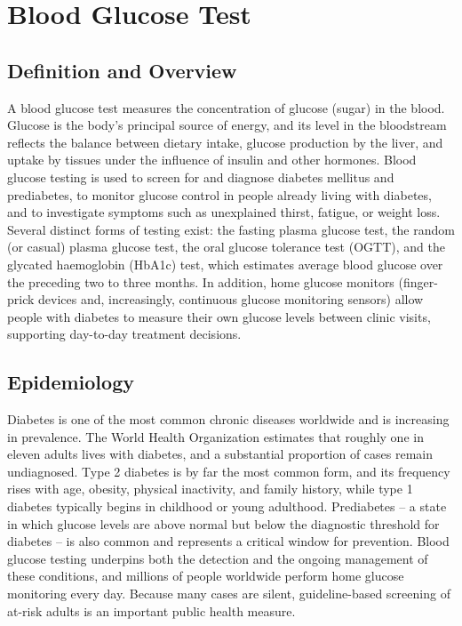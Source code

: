 \chapter{Blood Glucose Test}

\section*{Definition and Overview}
A blood glucose test measures the concentration of glucose (sugar) in the blood. Glucose is the body's principal source of energy, and its level in the bloodstream reflects the balance between dietary intake, glucose production by the liver, and uptake by tissues under the influence of insulin and other hormones. Blood glucose testing is used to screen for and diagnose diabetes mellitus and prediabetes, to monitor glucose control in people already living with diabetes, and to investigate symptoms such as unexplained thirst, fatigue, or weight loss. Several distinct forms of testing exist: the fasting plasma glucose test, the random (or casual) plasma glucose test, the oral glucose tolerance test (OGTT), and the glycated haemoglobin (HbA1c) test, which estimates average blood glucose over the preceding two to three months. In addition, home glucose monitors (finger-prick devices and, increasingly, continuous glucose monitoring sensors) allow people with diabetes to measure their own glucose levels between clinic visits, supporting day-to-day treatment decisions.

\section*{Epidemiology}
Diabetes is one of the most common chronic diseases worldwide and is increasing in prevalence. The World Health Organization estimates that roughly one in eleven adults lives with diabetes, and a substantial proportion of cases remain undiagnosed. Type 2 diabetes is by far the most common form, and its frequency rises with age, obesity, physical inactivity, and family history, while type 1 diabetes typically begins in childhood or young adulthood. Prediabetes -- a state in which glucose levels are above normal but below the diagnostic threshold for diabetes -- is also common and represents a critical window for prevention. Blood glucose testing underpins both the detection and the ongoing management of these conditions, and millions of people worldwide perform home glucose monitoring every day. Because many cases are silent, guideline-based screening of at-risk adults is an important public health measure.

